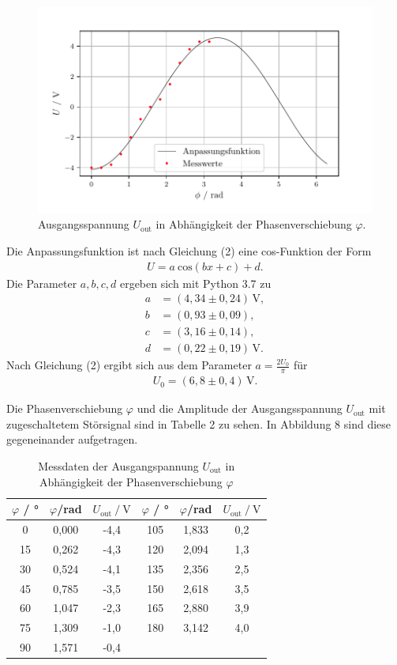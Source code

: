 \begin{figure}[H]
  \centering
  \includegraphics{plot1.pdf}
  \caption{Ausgangsspannung $U_\text{out}$ in Abhängigkeit der Phasenverschiebung $\varphi$.}
\end{figure}

Die Anpassungsfunktion ist nach Gleichung (2) eine cos-Funktion der Form
\begin{align*}
U = a\:\text{cos} (bx + c) + d.
\end{align*}
Die Parameter $a,b,c,d$ ergeben sich mit Python 3.7 zu
\begin{align*}
a &= (4,34 \pm 0,24)\,\si{\volt}, \\
b &= (0,93 \pm 0,09), \\
c &= (3,16 \pm 0,14), \\
d &= (0,22 \pm 0,19)\,\si{\volt}.
\end{align*}
Nach Gleichung (2) ergibt sich aus dem Parameter $a = \frac{2 U_\text{0}}{\pi}$ für
\begin{align*} 
U_\text{0} = (6,8 \pm 0,4)\,\si{\volt}.
\end{align*}

Die Phasenverschiebung $\varphi$ und die Amplitude der Ausgangsspannung $U_\text{out}$ 
mit zugeschaltetem Störsignal
sind in Tabelle 2 zu sehen. In Abbildung 8 sind diese gegeneinander aufgetragen.

\begin{table}[H]
\centering
\caption{Messdaten der Ausgangspannung $U_\text{out}$ in Abhängigkeit der Phasenverschiebung $\varphi$}
\label{tab:data3}
\begin{tabular}{c c c c c c}
\toprule
$\varphi$ \:/\: ° & $\varphi$\:/\:rad  & $U_\text{out} \:/\: \si{\volt}$ & $\varphi$ \:/\: ° & $\varphi$\:/\:rad   & $U_\text{out} \:/\: \si{\volt}$\\
\midrule
0  & 0,000 & -4,4 & 105 & 1,833 & 0,2 \\
15 & 0,262 & -4,3 & 120 & 2,094 & 1,3 \\
30 & 0,524 & -4,1 & 135 & 2,356 & 2,5 \\
45 & 0,785 & -3,5 & 150 & 2,618 & 3,5 \\
60 & 1,047 & -2,3 & 165 & 2,880 & 3,9 \\
75 & 1,309 & -1,0 & 180 & 3,142 & 4,0 \\
90 & 1,571 & -0,4 & & & \\
\bottomrule
\end{tabular}
\end{table}

